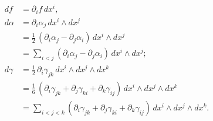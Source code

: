 \documentclass[12pt]{article}
\begin{document}
\begin{align*}
  df &= \partial_i f\, dx^i,\\
  d\alpha &= \partial_i \alpha_j \,dx^i\wedge dx^j \\
  &=\tfrac{1}{2}\,(\partial_i \alpha_j-\partial_j\alpha_i) \,dx^i\wedge dx^j \\
  &=\sum_{i<j} (\partial_i \alpha_j-\partial_j\alpha_i) \,dx^i\wedge dx^j;\\
  d\gamma &= \tfrac{1}{2}\, \partial_i \gamma_{jk} \,dx^i\wedge
  dx^j\wedge dx^k \\
  &=\tfrac{1}{6}\,(\partial_i \gamma_{jk}+\partial_j \gamma_{ki}
  +\partial_k \gamma_{ij}) \,dx^i\wedge
  dx^j\wedge dx^k \\
  &=\sum_{i<j<k}(\partial_i \gamma_{jk}+\partial_j \gamma_{ki}
  +\partial_k \gamma_{ij}) \,dx^i\wedge
  dx^j\wedge dx^k .
\end{align*}
\end{document}
